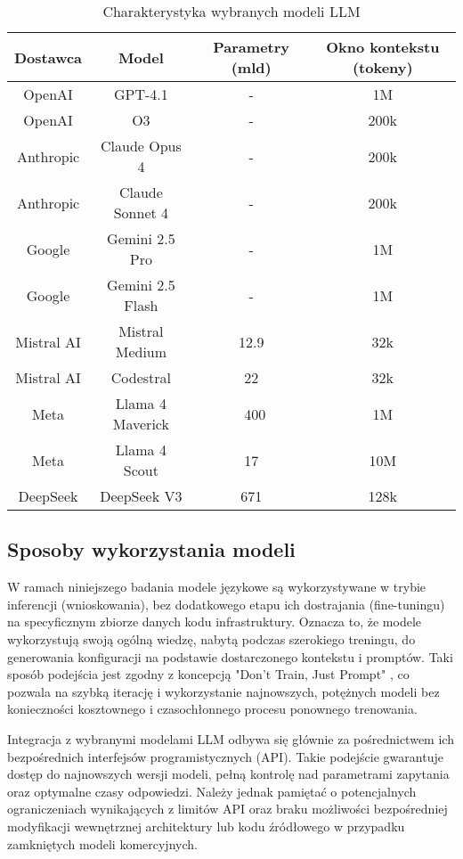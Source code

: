 \begin{table}[!h] \centering
\caption{Charakterystyka wybranych modeli LLM}
\label{tab:llm-characteristic}
\begin{tabular}{| c | c | c | c |} \hline
\textbf{Dostawca} & \textbf{Model} & \textbf{Parametry (mld)} & \textbf{Okno kontekstu (tokeny)} \\ \hline\hline
OpenAI & GPT-4.1 & - & 1M \\ \hline
OpenAI & O3 & - & 200k \\ \hline
Anthropic & Claude Opus 4 & - & 200k \\ \hline
Anthropic & Claude Sonnet 4 & - & 200k \\ \hline
Google & Gemini 2.5 Pro & - & 1M \\ \hline
Google & Gemini 2.5 Flash & - & 1M \\ \hline
Mistral AI & Mistral Medium & 12.9 & 32k \\ \hline
Mistral AI & Codestral & 22 & 32k \\ \hline
Meta & Llama 4 Maverick & ~400 & 1M \\ \hline
Meta & Llama 4 Scout & 17 & 10M \\ \hline
DeepSeek & DeepSeek V3 & 671 & 128k \\ \hline
\end{tabular}
\end{table}

\subsection{Sposoby wykorzystania modeli}

W ramach niniejszego badania modele językowe są wykorzystywane w trybie inferencji (wnioskowania), bez dodatkowego etapu ich dostrajania (fine-tuningu) na specyficznym zbiorze danych kodu infrastruktury. Oznacza to, że modele wykorzystują swoją ogólną wiedzę, nabytą podczas szerokiego treningu, do generowania konfiguracji na podstawie dostarczonego kontekstu i promptów. Taki sposób podejścia jest zgodny z koncepcją "Don't Train, Just Prompt" \cite{kratzke_dont_2024}, co pozwala na szybką iterację i wykorzystanie najnowszych, potężnych modeli bez konieczności kosztownego i czasochłonnego procesu ponownego trenowania.

Integracja z wybranymi modelami LLM odbywa się głównie za pośrednictwem ich bezpośrednich interfejsów programistycznych (API). Takie podejście gwarantuje dostęp do najnowszych wersji modeli, pełną kontrolę nad parametrami zapytania oraz optymalne czasy odpowiedzi. Należy jednak pamiętać o potencjalnych ograniczeniach wynikających z limitów API oraz braku możliwości bezpośredniej modyfikacji wewnętrznej architektury lub kodu źródłowego w przypadku zamkniętych modeli komercyjnych.

